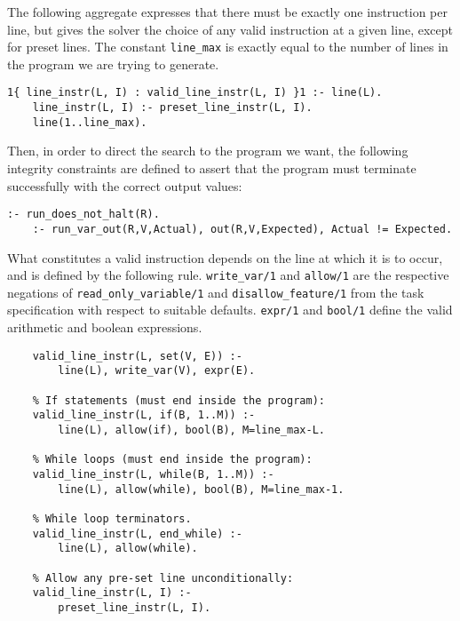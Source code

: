 \documentclass[a4paper,twoside,notitlepage]{report}
\begin{document}
The following aggregate expresses that there must be exactly one 
instruction per line, but gives the solver the choice of any valid 
instruction at a given line, except for preset lines. The constant 
\verb|line_max| is exactly equal to the number of lines in the program we 
are trying to generate.
\begin{Verbatim}[samepage=true]
    1{ line_instr(L, I) : valid_line_instr(L, I) }1 :- line(L).
    line_instr(L, I) :- preset_line_instr(L, I).
    line(1..line_max).
\end{Verbatim}

Then, in order to direct the search to the program we want, the following 
integrity constraints are defined to assert that the program must 
terminate successfully with the correct output values:
\begin{Verbatim}[samepage=true]
    :- run_does_not_halt(R).
    :- run_var_out(R,V,Actual), out(R,V,Expected), Actual != Expected.
\end{Verbatim}

What constitutes a valid instruction depends on the line at which it is to 
occur, and is defined by the following rule. \verb|write_var/1| and 
\verb|allow/1| are the respective negations of \verb|read_only_variable/1| 
and \verb|disallow_feature/1| from the task specification with respect to 
suitable defaults. \verb|expr/1| and \verb|bool/1| define the valid 
arithmetic and boolean expressions.
\begin{Verbatim}[samepage=true]
    % Setting a writable variable:
    valid_line_instr(L, set(V, E)) :-
        line(L), write_var(V), expr(E).

    % If statements (must end inside the program):
    valid_line_instr(L, if(B, 1..M)) :-
        line(L), allow(if), bool(B), M=line_max-L.

    % While loops (must end inside the program):
    valid_line_instr(L, while(B, 1..M)) :-
        line(L), allow(while), bool(B), M=line_max-1.

    % While loop terminators.
    valid_line_instr(L, end_while) :-
        line(L), allow(while).

    % Allow any pre-set line unconditionally:
    valid_line_instr(L, I) :-
        preset_line_instr(L, I).
\end{Verbatim}
\end{document}
